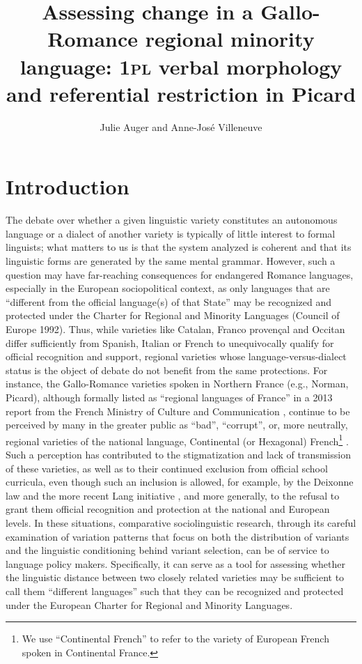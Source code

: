 \documentclass[output=paper,colorlinks,citecolor=brown]{langscibook}
\author{Julie Auger \affiliation{Université de Montréal} and Anne-José Villeneuve\affiliation{University of Alberta}}
\title[Assessing change in a Gallo-Romance regional minority language]{Assessing change in a Gallo-Romance regional minority language: 1\textsc{pl} verbal morphology and referential restriction in Picard}
\begin{document}
\maketitle

\section{Introduction}
The debate over whether a given linguistic variety constitutes an autonomous language or a dialect of another variety is typically of little interest to formal linguists; what matters to us is that the system analyzed is coherent and that its linguistic forms are generated by the same mental grammar. However, such a question may have far-reaching consequences for endangered Romance languages, especially in the European sociopolitical context, as only languages that are “different from the official language(s) of that State” may be recognized and protected under the Charter for Regional and Minority Languages (Council of Europe 1992). Thus, while varieties like Catalan, Franco provençal and Occitan differ sufficiently from Spanish, Italian or French to unequivocally qualify for official recognition and support, regional varieties whose language-versus-dialect status is the object of debate do not benefit from the same protections. For instance, the Gallo-Romance varieties spoken in Northern France (e.g., Norman, Picard), although formally listed as “regional languages of France” in a 2013 report from the French Ministry of Culture and Communication \citep{DGLFLF2013}, continue to be perceived by many in the greater public as ``bad'', ``corrupt'', or, more neutrally, regional varieties of the national language, Continental (or Hexagonal) French\footnote{We use ``Continental French'' to refer to the variety of European French spoken in Continental France.}  \citep{eloy_laffaire_1997}. Such a perception has contributed to the stigmatization and lack of transmission of these varieties, as well as to their continued exclusion from official school curricula, even though such an inclusion is allowed, for example, by the Deixonne law and the more recent Lang initiative \citep{eloy_constitution_1997}, and more generally, to the refusal to grant them official recognition and protection at the national and European levels. In these situations, comparative sociolinguistic research, through its careful examination of variation patterns that focus on both the distribution of variants and the linguistic conditioning behind variant selection, can be of service to language policy makers. Specifically, it can serve as a tool for assessing whether the linguistic distance between two closely related varieties may be sufficient to call them “different languages” such that they can be recognized and protected under the European Charter for Regional and Minority Languages.
\end{document}

